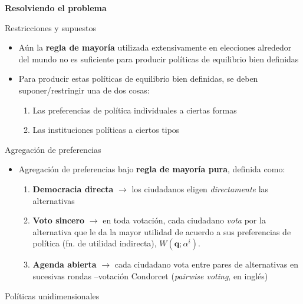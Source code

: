 \documentclass[
  ignorenonframetext,
]{beamer}
\providecommand{\tightlist}{%
  \setlength{\itemsep}{0pt}\setlength{\parskip}{0pt}}\usepackage{longtable,booktabs,array}
\begin{document}
\begin{frame}{\textbf{Resolviendo el problema}}
\begin{block}{Restricciones y supuestos}
\protect\hypertarget{restricciones-y-supuestos}{}
\begin{itemize}
\tightlist
\item
  Aún la \textbf{regla de mayoría} utilizada extensivamente en
  elecciones alrededor del mundo no es suficiente para producir
  políticas de equilibrio bien definidas
\item
  Para producir estas políticas de equilibrio bien definidas, se deben
  suponer/restringir una de dos cosas:

  \begin{enumerate}
  \tightlist
  \item
    Las preferencias de política individuales a ciertas formas
  \item
    Las instituciones políticas a ciertos tipos
  \end{enumerate}
\end{itemize}
\end{block}

\begin{block}{Agregación de preferencias}
\protect\hypertarget{agregaciuxf3n-de-preferencias}{}
\begin{itemize}
\tightlist
\item
  Agregación de preferencias bajo \textbf{regla de mayoría pura},
  definida como:

  \begin{enumerate}
  \tightlist
  \item
    \textbf{Democracia directa} \(\longrightarrow\) los ciudadanos
    eligen \emph{directamente} las alternativas
  \item
    \textbf{Voto sincero} \(\longrightarrow\) en toda votación, cada
    ciudadano \emph{vota} por la alternativa que le da la mayor utilidad
    de acuerdo a sus preferencias de política (fn. de utilidad
    indirecta), \(W(\mathbf{q};\alpha^{i})\).
  \item
    \textbf{Agenda abierta} \(\longrightarrow\) cada ciudadano vota
    entre pares de alternativas en sucesivas rondas --votación Condorcet
    (\emph{pairwise voting}, en inglés)
  \end{enumerate}
\end{itemize}
\end{block}

\begin{block}{Políticas unidimensionales}
\protect\hypertarget{poluxedticas-unidimensionales}{}
\begin{tcolorbox}[enhanced jigsaw, titlerule=0mm, breakable, colback=white, left=2mm, coltitle=black, toptitle=1mm, leftrule=.75mm, opacityback=0, bottomtitle=1mm, opacitybacktitle=0.6, colbacktitle=quarto-callout-note-color!10!white, title={Definición 1}, toprule=.15mm, colframe=quarto-callout-note-color-frame, rightrule=.15mm, arc=.35mm, bottomrule=.15mm]


\end{tcolorbox}
\end{block}
\end{frame}
\end{document}
